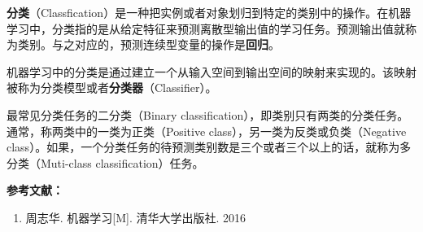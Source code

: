 
\textbf{分类}（Classfication）是一种把实例或者对象划归到特定的类别中的操作。在机器学习中，分类指的是从给定特征来预测离散型输出值的学习任务。预测输出值就称为类别。与之对应的，预测连续型变量的操作是\textbf{回归}。

机器学习中的分类是通过建立一个从输入空间到输出空间的映射来实现的。该映射被称为分类模型或者\textbf{分类器}（Classifier）。

最常见分类任务的二分类（Binary classification），即类别只有两类的分类任务。通常，称两类中的一类为正类（Positive class），另一类为反类或负类（Negative class）。如果，一个分类任务的待预测类别数是三个或者三个以上的话，就称为多分类（Muti-class classification）任务。




\textbf{参考文献：}
\begin{enumerate}
\item 周志华. 机器学习[M]. 清华大学出版社. 2016
\end{enumerate}